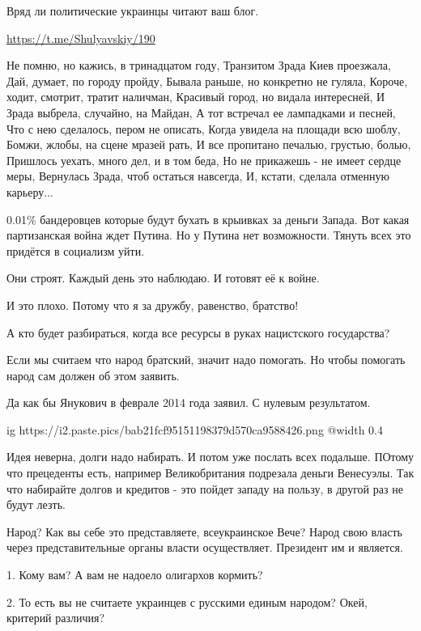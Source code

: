 \begin{itemize}

Вряд ли политические украинцы читают ваш блог.


\url{https://t.me/Shulyavskiy/190}

\obeycr
Не помню, но кажись, в тринадцатом году,
Транзитом Зрада Киев проезжала,
Дай, думает, по городу пройду,
Бывала раньше, но конкретно не гуляла,
Короче, ходит, смотрит, тратит наличман,
Красивый город, но видала интересней,
И Зрада выбрела, случайно, на Майдан,
А тот встречал ее лампадками и песней,
Что с нею сделалось, пером не описать,
Когда увидела на площади всю шоблу,
Бомжи, жлобы, на сцене мразей рать,
И все пропитано печалью, грустью, болью,
Пришлось уехать, много дел, и в том беда,
Но не прикажешь - не имеет сердце меры,
Вернулась Зрада, чтоб остаться навсегда,
И, кстати, сделала отменную карьеру...
\restorecr


0.01\% бандеровцев которые будут бухать в крыивках за деньги Запада. Вот какая
партизанская война ждет Путина. Но у Путина нет возможности. Тянуть всех это
придётся в социализм уйти.


Они строят. Каждый день это наблюдаю. И готовят её к войне.

И это плохо. Потому что я за дружбу, равенство, братство!

А кто будет разбираться, когда все ресурсы в руках нацистского государства?


Если мы считаем что народ братский, значит надо помогать. Но чтобы помогать
народ сам должен об этом заявить.


Да как бы Янукович в феврале 2014 года заявил. С нулевым результатом.


\ifcmt
  ig https://i2.paste.pics/bab21fcf95151198379d570ca9588426.png
  @width 0.4
\fi


Идея неверна, долги надо набирать. И потом уже послать всех подальше. ПОтому
что прецеденты есть, например Великобритания подрезала деньги Венесуэлы. Так
что набирайте долгов и кредитов  - это пойдет западу на пользу, в другой раз не
будут лезть.


Народ? Как вы себе это представляете, всеукраинское Вече? Народ свою власть
через представительные органы власти осуществляет. Президент им и является.


1. Кому вам? А вам не надоело олигархов кормить?

2. То есть вы не считаете украинцев с русскими единым народом? Окей, критерий
различия?

\end{itemize} %

